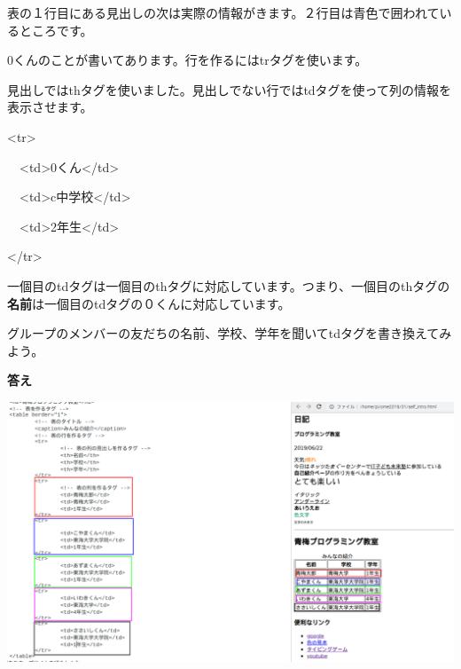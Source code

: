 \documentclass[a4paper,12pt]{jarticle}
\begin{document}
\flushleft

\bigskip

表の１行目にある見出しの次は実際の情報がきます。２行目は青色で囲われているところです。

0くんのことが書いてあります。行を作るにはtrタグを使います。

見出しではthタグを使いました。見出しでない行ではtdタグを使って列の情報を表示させます。

{\textless}tr{\textgreater}

\ \ {\textless}td{\textgreater}0くん{\textless}/td{\textgreater}

\ \ {\textless}td{\textgreater}c中学校{\textless}/td{\textgreater}

\ \ {\textless}td{\textgreater}2年生{\textless}/td{\textgreater}

{\textless}/tr{\textgreater}

一個目のtdタグは一個目のthタグに対応しています。つまり、一個目のthタグの\textbf{名前}は一個目のtdタグの０くんに対応しています。


\bigskip


\bigskip

グループのメンバーの友だちの名前、学校、学年を聞いてtdタグを書き換えてみよう。


\bigskip


\bigskip



\bigskip

\clearpage
\textbf{答え}




\bigskip


\bigskip


\bigskip
\includegraphics[width=\textwidth]{textbook-img192.png}
\end{document}
